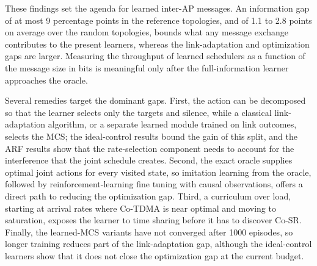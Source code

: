 \documentclass{ieeeaccess}
\begin{document}
These findings set the agenda for learned inter-AP messages. An information gap of at most 9 percentage points in the reference topologies, and of 1.1 to 2.8 points on average over the random topologies, bounds what any message exchange contributes to the present learners, whereas the link-adaptation and optimization gaps are larger. Measuring the throughput of learned schedulers as a function of the message size in bits is meaningful only after the full-information learner approaches the oracle.

Several remedies target the dominant gaps. First, the action can be decomposed so that the learner selects only the targets and silence, while a classical link-adaptation algorithm, or a separate learned module trained on link outcomes, selects the MCS; the ideal-control results bound the gain of this split, and the ARF results show that the rate-selection component needs to account for the interference that the joint schedule creates. Second, the exact oracle supplies optimal joint actions for every visited state, so imitation learning from the oracle, followed by reinforcement-learning fine tuning with causal observations, offers a direct path to reducing the optimization gap. Third, a curriculum over load, starting at arrival rates where Co-TDMA is near optimal and moving to saturation, exposes the learner to time sharing before it has to discover Co-SR. Finally, the learned-MCS variants have not converged after 1000 episodes, so longer training reduces part of the link-adaptation gap, although the ideal-control learners show that it does not close the optimization gap at the current budget.
\end{document}
